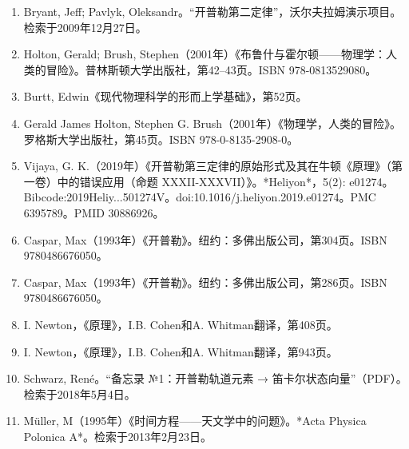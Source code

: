 \begin{enumerate}
\item Bryant, Jeff; Pavlyk, Oleksandr。“开普勒第二定律”，沃尔夫拉姆演示项目。检索于2009年12月27日。
\item Holton, Gerald; Brush, Stephen（2001年）《布鲁什与霍尔顿——物理学：人类的冒险》。普林斯顿大学出版社，第42–43页。ISBN 978-0813529080。
\item Burtt, Edwin《现代物理科学的形而上学基础》，第52页。
\item Gerald James Holton, Stephen G. Brush（2001年）《物理学，人类的冒险》。罗格斯大学出版社，第45页。ISBN 978-0-8135-2908-0。
\item Vijaya, G. K.（2019年）《开普勒第三定律的原始形式及其在牛顿《原理》（第一卷）中的错误应用（命题 XXXII-XXXVII）》。*Heliyon*，5(2): e01274。Bibcode:2019Heliy...501274V。doi:10.1016/j.heliyon.2019.e01274。PMC 6395789。PMID 30886926。
\item Caspar, Max（1993年）《开普勒》。纽约：多佛出版公司，第304页。ISBN 9780486676050。
\item Caspar, Max（1993年）《开普勒》。纽约：多佛出版公司，第286页。ISBN 9780486676050。
\item I. Newton，《原理》，I.B. Cohen和A. Whitman翻译，第408页。
\item I. Newton，《原理》，I.B. Cohen和A. Whitman翻译，第943页。
\item Schwarz, René。“备忘录 №1：开普勒轨道元素 → 笛卡尔状态向量”（PDF）。检索于2018年5月4日。
\item Müller, M（1995年）《时间方程——天文学中的问题》。*Acta Physica Polonica A*。检索于2013年2月23日。
\end{enumerate}









 
 
